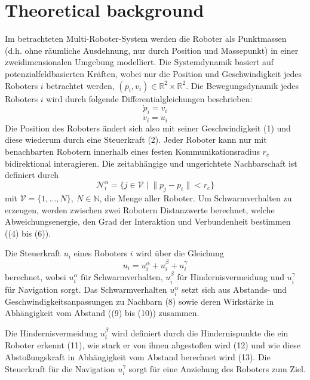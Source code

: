 \documentclass[conference]{IEEEtran}
\begin{document}
\section{Theoretical background}
Im betrachteten Multi-Roboter-System werden die Roboter als Punktmassen 
(d.h. ohne räumliche Ausdehnung, nur durch Position und Massepunkt) in einer 
zweidimensionalen Umgebung modelliert. Die Systemdynamik basiert auf potenzialfeldbasierten 
Kräften, wobei nur die Position und Geschwindigkeit jedes Roboters $i$ betrachtet werden,
$(p_i, v_i) \in \mathbb{R}^2 \times \mathbb{R}^2$.
Die Bewegungsdynamik jedes Roboters $i$ wird durch folgende Differentialgleichungen beschrieben:
\begin{equation}
    \dot{p}_i = v_i
\end{equation}
\begin{equation}
    \dot{v}_i = u_i
\end{equation}
Die Position des Roboters ändert sich also mit seiner Geschwindigkeit (1) und diese wiederum durch eine Steuerkraft (2).
Jeder Roboter kann nur mit benachbarten Robotern innerhalb eines festen 
Kommunikationsradius $r_c$ bidirektional interagieren. Die zeitabhängige und ungerichtete Nachbarschaft ist definiert durch
\begin{equation}
\mathcal{N}_i^\alpha = \{ j \in \mathcal{V} \; | \; \| p_j - p_i \| < r_c \}
\end{equation}
mit $\mathcal{V} = \{1, \ldots, N\},\ N \in \mathbb{N}$, die Menge aller Roboter.
Um Schwarmverhalten zu erzeugen, werden zwischen zwei Robotern Distanzwerte berechnet, 
welche Abweichungsenergie, den Grad der Interaktion und Verbundenheit bestimmen ((4) bis (6)).

Die Steuerkraft $u_i$ eines Roboters $i$ wird über die Gleichung
\begin{equation}
u_i = u_i^\alpha + u_i^\beta + u_i^\gamma
\end{equation}
berechnet, wobei $u_i^\alpha$ für Schwarmverhalten, $u_i^\beta$ für 
Hindernisvermeidung und $u_i^\gamma$ für Navigation sorgt. Das Schwarmverhalten 
$u_i^\alpha$ setzt sich aus Abstands- und Geschwindigkeitsanpassungen zu Nachbarn (8) 
sowie deren Wirkstärke in Abhängigkeit vom Abstand ((9) bis (10)) zusammen.

Die Hindernisvermeidung $u_i^\beta$ wird definiert durch die Hindernispunkte 
die ein Roboter erkennt (11), wie stark er von ihnen 
abgestoßen wird (12) und wie diese Abstoßungskraft in Abhängigkeit vom Abstand 
berechnet wird (13). Die Steuerkraft für die Navigation $u_i^\gamma$ sorgt für eine Anziehung
des Roboters zum Ziel.
\end{document}
